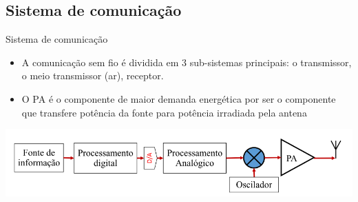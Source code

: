 \documentclass{if-beamer}
\begin{document}

\subsection{Sistema de comunicação}
\begin{frame}{Sistema de comunicação}
	\begin{itemize}
		\item A comunicação sem fio é dividida em 3 sub-sistemas principais: o transmissor, o meio transmissor (ar), receptor.
		\item O PA é o componente de maior demanda energética por ser o componente que transfere potência da fonte para potência irradiada pela antena
	\end{itemize}
	\includegraphics[scale=0.5]{sistematrasmissorpng.png}
\end{frame}

\end{document}
